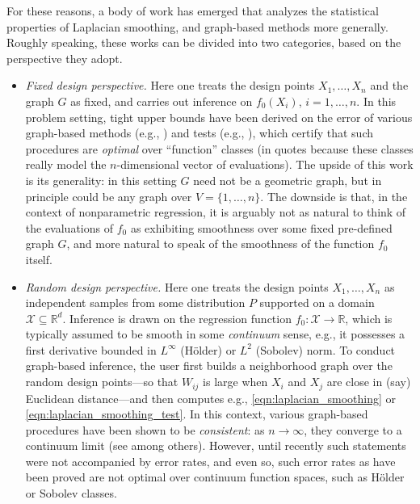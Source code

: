 \documentclass[twoside]{article}
\newcommand{\Reals}{\mathbb{R}}
\newcommand{\1}{\mathbf{1}}
\newcommand{\Rd}{\Reals^d}
\newcommand{\Xset}{\mathcal{X}}
\newcommand{\Leb}{L}
\theoremstyle{definition}
\theoremstyle{remark}
\begin{document}
For these reasons, a body of work has emerged that analyzes the statistical properties of Laplacian smoothing, and graph-based methods more generally. Roughly speaking, these works can be divided into two categories, based on the perspective they adopt. 
\begin{itemize}
	\item \emph{Fixed design perspective.} Here one treats the design points $X_1,\ldots,X_n$ and the graph $G$ as fixed, and carries out inference on $f_0(X_i)$, $i=1,\ldots,n$. In this problem setting, tight upper bounds have been derived on the error of various graph-based methods (e.g., \citet{wang2016,hutter2016,sadhanala16,sadhanala17,kirichenko2017,kirichenko2018}) and tests (e.g., \citet{sharpnack2010identifying,sharpnack2013b,sharpnack2013,sharpnack2015}), which certify that such procedures are \emph{optimal} over ``function'' classes (in quotes because these classes really model the $n$-dimensional vector of evaluations). The upside of this work is its generality: in this setting $G$ need not be a geometric graph, but in principle could be any graph over $V=\{1,\ldots,n\}$. The downside is that, in the context of nonparametric regression, it is arguably not as natural to think of the evaluations of $f_0$ as exhibiting smoothness over some fixed pre-defined graph $G$, and more natural to speak of the smoothness of the function $f_0$ itself. 
	\item \emph{Random design perspective.} Here one treats the design points $X_1,\ldots,X_n$ as independent samples from some distribution $P$ supported on a domain $\Xset \subseteq \Rd$. Inference is drawn on the regression function $f_0: \Xset \to \Reals$, which is typically assumed to be smooth in some \emph{continuum} sense, e.g., it possesses a first derivative bounded in $L^{\infty}$ (H\"{o}lder) or $\Leb^2$ (Sobolev) norm. To conduct graph-based inference, the user first builds a neighborhood graph over the random design points---so that $W_{ij}$ is large when $X_i$ and $X_j$ are close in (say) Euclidean distance---and then computes e.g., \eqref{eqn:laplacian_smoothing} or \eqref{eqn:laplacian_smoothing_test}. In this context, various graph-based procedures have been shown to be \emph{consistent}: as $n \to \infty$, they converge to a continuum limit (see \citet{belkin07,vonluxburg2008,trillos2018} among others). However, until recently such statements were not accompanied by error rates, and even so, such error rates as have been proved \citep{lee2016,trillos2020} are not optimal over continuum function spaces, such as H\"{o}lder or Sobolev classes. 
\end{itemize}
\end{document}
